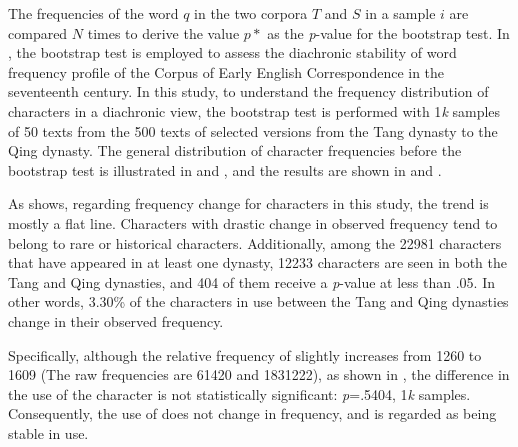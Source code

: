 The frequencies of the word $q$ in the two corpora $T$ and $S$ in a sample $i$ are compared $N$ times to derive the value $p*$ as the \textit{p}-value for the bootstrap test. In \textcite{lijffijt2012ceecing}, the bootstrap test is employed to assess the diachronic stability of word frequency profile of the Corpus of Early English Correspondence in the seventeenth century. In this study, to understand the frequency distribution of characters in a diachronic view, the bootstrap test is performed with 1\textit{k} samples of 50 texts from the 500 texts of selected versions from the Tang dynasty to the Qing dynasty. The general distribution of character frequencies before the bootstrap test is illustrated in  and , and the results are shown in  and .

As  shows, regarding frequency change for characters in this study, the trend is mostly a flat line. Characters with drastic change in observed frequency tend to belong to rare or historical characters. Additionally, among the \num{22981} characters that have appeared in at least one dynasty, \num{12233} characters are seen in both the Tang and Qing dynasties, and \num{404} of them receive a \textit{p}-value at less than .05. In other words, 3.30\% of the characters in use between the Tang and Qing dynasties change in their observed frequency.

Specifically, although the relative frequency of \jia slightly increases from \num{1260} to \num{1609} (The raw frequencies are \num{61420} and \num{1831222}), as shown in , the difference in the use of the character is not statistically significant: \textit{p}=.5404, 1\textit{k} samples. Consequently, the use of \jia does not change in frequency, and is regarded as being stable in use.

